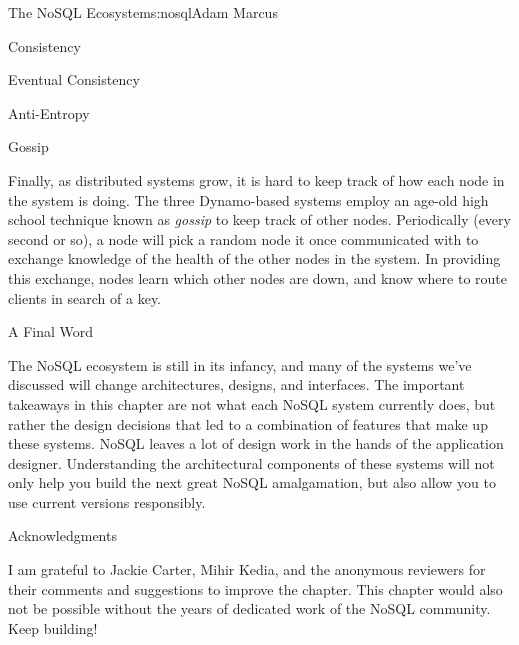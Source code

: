 \begin{aosachapter}{The NoSQL Ecosystem}{s:nosql}{Adam Marcus}
\begin{aosasect1}{Consistency}
\begin{aosasect2}{Eventual Consistency}
\begin{aosasect3}{Anti-Entropy}
\end{aosasect3}

\begin{aosasect3}{Gossip}

Finally, as distributed systems grow, it is hard to keep track of how
each node in the system is doing.  The three Dynamo-based systems
employ an age-old high school technique known as \emph{gossip} to keep
track of other nodes.  Periodically (every second or so), a node will
pick a random node it once communicated with to exchange knowledge of
the health of the other nodes in the system.  In providing this
exchange, nodes learn which other nodes are down, and know where to
route clients in search of a key.

\end{aosasect3}

\end{aosasect2}

\end{aosasect1}

\begin{aosasect1}{A Final Word}

The NoSQL ecosystem is still in its infancy, and many of the
systems we've discussed will change architectures, designs, and
interfaces.  The important takeaways in this chapter are not what
each NoSQL system currently does, but rather the design decisions that
led to a combination of features that make up these systems.  NoSQL
leaves a lot of design work in the hands of the application designer.
Understanding the architectural components of these systems will not
only help you build the next great NoSQL amalgamation, but also allow
you to use current versions responsibly.

\end{aosasect1}

\begin{aosasect1}{Acknowledgments}

I am grateful to Jackie Carter, Mihir Kedia, and the anonymous
reviewers for their comments and suggestions to improve the chapter.
This chapter would also not be possible without the years of dedicated
work of the NoSQL community.  Keep building!

\end{aosasect1}

\end{aosachapter}
